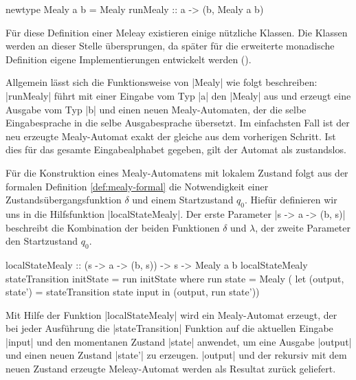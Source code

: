 \begin{haskell}[label={lst:haskell-mealy},caption={[Definition Mealy in Haskell]Definition Mealy in Haskell\protect\footnotemark}]
newtype Mealy a b = Mealy { runMealy :: a -> (b, Mealy a b) }
\end{haskell}

Für diese Definition einer Meleay existieren einige nützliche Klassen. Die Klassen werden an dieser Stelle übersprungen, da 
später für die erweiterte monadische Definition eigene Implementierungen entwickelt werden ().

Allgemein lässt sich die Funktionsweise von |Mealy| wie folgt beschreiben:\\
|runMealy| führt mit einer Eingabe vom Typ |a| den |Mealy| aus und erzeugt eine Ausgabe vom Typ |b| und einen neuen Mealy-Automaten, der die selbe Eingabesprache in die selbe Ausgabesprache übersetzt. Im einfachsten Fall ist der neu erzeugte Mealy-Automat exakt der gleiche aus dem vorherigen Schritt. Ist dies für das gesamte Eingabealphabet gegeben, gilt der Automat als zustandslos.

Für die Konstruktion eines Mealy-Automatens mit lokalem Zustand folgt aus der formalen Definition \ref{def:mealy-formal} die Notwendigkeit einer Zustandsübergangsfunktion $\delta$ und einem Startzustand $q_0$. Hiefür definieren wir uns in  die Hilfsfunktion |localStateMealy|. Der erste Parameter |s -> a -> (b, s)| beschreibt die Kombination der beiden Funktionen $\delta$ und $\lambda$, der zweite Parameter den Startzustand $q_0$.

\begin{haskell}[label={lst:state-mealy-ctr},caption={[Konstruktion Mealy mit lokalem Zustand]Hilfsfunktion zur Konstruktion eines Mealy-Automatens mit lokalem Zustand}]
localStateMealy :: (s -> a -> (b, s)) -> s -> Mealy a b
localStateMealy stateTransition initState = run initState where
  run state = Mealy ( 
    let (output, state') = stateTransition state input 
    in (output, run state'))
\end{haskell}

Mit Hilfe der Funktion |localStateMealy| wird ein Mealy-Automat erzeugt, der bei jeder Ausführung die |stateTransition| Funktion auf die aktuellen Eingabe |input| und den momentanen Zustand |state| anwendet, um eine Ausgabe |output| und einen neuen Zustand |state'| zu erzeugen. |output| und der rekursiv mit dem neuen Zustand erzeugte Meleay-Automat werden als Resultat zurück geliefert.

